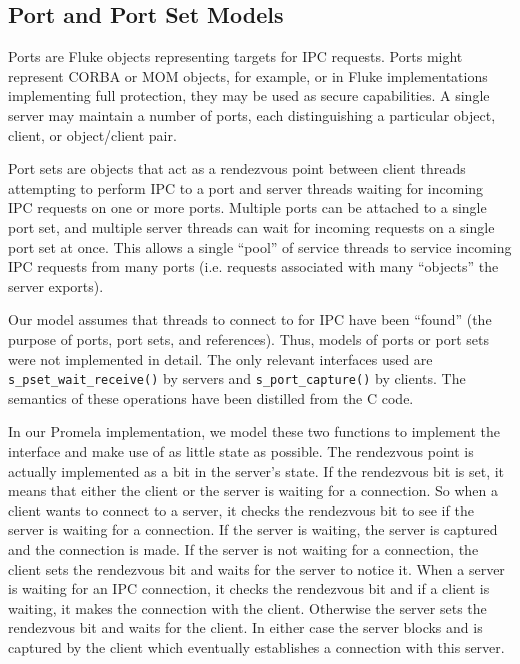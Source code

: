 \subsection{Port and Port Set Models}

Ports are Fluke objects representing targets for IPC requests.
Ports might represent CORBA or MOM objects, for example,
or in Fluke implementations implementing full protection,
they may be used as secure capabilities.
A single server may maintain a number of ports,
each distinguishing a particular object, client,
or object/client pair.

Port sets are objects that act as a rendezvous point
between client threads attempting to perform IPC to a port
and server threads waiting for incoming IPC requests on one or more ports.
Multiple ports can be attached to a single port set,
and multiple server threads can wait for incoming requests
on a single port set at once.
This allows a single ``pool'' of service threads
to service incoming IPC requests from many ports
(i.e. requests associated with many ``objects'' the server exports).

Our model assumes that threads to connect
to for IPC have been ``found'' (the purpose of ports, port sets, and
references). Thus, models of ports or port sets were not
implemented in detail.  The only relevant interfaces used are 
{\tt s_pset_wait_receive()} by servers and {\tt s_port_capture()} by
clients.  The semantics of these operations have been distilled from
the C code.  


In our Promela implementation, we model these two functions to implement
the interface and make use of as little state as possible. The
rendezvous point is actually implemented as a bit in the server's
state. If the rendezvous bit is set, it means that either the client
or the server is waiting for a connection.
So when a client wants to connect to a server, it checks the
rendezvous bit to see if the server is waiting for a connection. If
the server is waiting, the server is captured and the connection
is made. If the server is not waiting for a connection, the client
sets the rendezvous 
bit and waits for the server to notice it. When a server is waiting
for an IPC  connection, it checks the rendezvous bit and if a client
is waiting, it makes the connection with the client. Otherwise the
server sets the rendezvous bit and waits for the client. In either
case the server blocks and is captured by the client which eventually
establishes a connection with this server.

